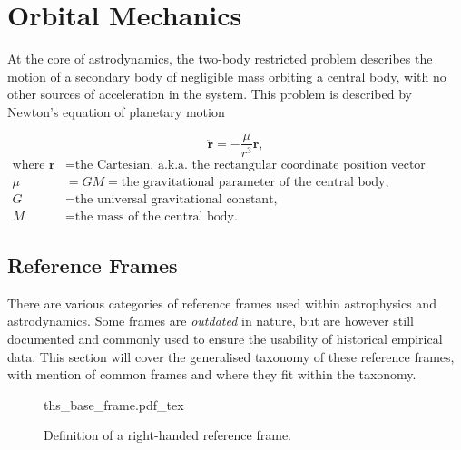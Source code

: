 \chapter{Orbital Mechanics}

At the core of astrodynamics, the two-body restricted problem describes the
motion of a secondary body of negligible mass orbiting a central body, with no
other sources of acceleration in the system. This problem is described by
Newton's equation of planetary motion

\begin{equation}
    \ddot{\mathbf{r}}=-\frac{\mu}{r^3}\mathbf{r},
    \label{eq:newtons_equation_planetary}
\end{equation}
\begin{equation*}
    \begin{aligned}
        \textrm{where }
        \mathbf{r}&=\textrm{the Cartesian, a.k.a. the rectangular coordinate position vector relative to the central body,}\\
        \mu&=GM=\textrm{the gravitational parameter of the central body,}\\
        G&=\textrm{the universal gravitational constant,}\\
        M&=\textrm{the mass of the central body.}
    \end{aligned}
\end{equation*}

\section{Reference Frames}

There are various categories of reference frames used within astrophysics and
astrodynamics. Some frames are \textit{outdated} in nature, but are however
still documented and commonly used to ensure the usability of historical
empirical data. This section will cover the generalised taxonomy of these
reference frames, with mention of common frames and where they fit within the
taxonomy.

\begin{figure}[h]
    \centering
    \def\svgwidth{0.75\linewidth}
    {ths_base_frame.pdf_tex}
    \caption{Definition of a right-handed reference frame.}
    \label{fig:frames_rh}
\end{figure}

